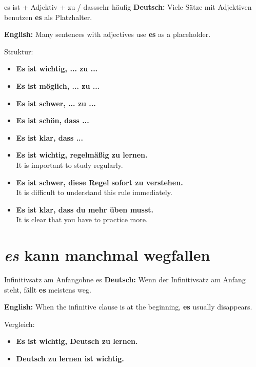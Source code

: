 \documentclass[a4paper,11pt]{article}
\newcommand{\GermanText}[1]{\textbf{Deutsch: }#1\par}
\newcommand{\EnglishText}[1]{{\small\color{SoftGray}\textbf{English: }#1\par}}
\newcommand{\ExampleItem}[2]{\item \textbf{#1}\\{\small\color{SoftGray}#2}}
\begin{document}
        \begin{grammarentry}{es ist + Adjektiv + zu / dass}{sehr häufig}
            \GermanText{Viele Sätze mit Adjektiven benutzen \textbf{es} als Platzhalter.}
            \EnglishText{Many sentences with adjectives use \textbf{es} as a placeholder.}
            
            Struktur:
            \begin{itemize}
                \item \textbf{Es ist wichtig, ... zu ...}
                \item \textbf{Es ist möglich, ... zu ...}
                \item \textbf{Es ist schwer, ... zu ...}
                \item \textbf{Es ist schön, dass ...}
                \item \textbf{Es ist klar, dass ...}
            \end{itemize}
        \end{grammarentry}
        
        \begin{exbox}
            \begin{itemize}
                \ExampleItem{Es ist wichtig, regelmäßig zu lernen.}{It is important to study regularly.}
                \ExampleItem{Es ist schwer, diese Regel sofort zu verstehen.}{It is difficult to understand this rule immediately.}
                \ExampleItem{Es ist klar, dass du mehr üben musst.}{It is clear that you have to practice more.}
            \end{itemize}
        \end{exbox}
    
    
    \section{\textit{es} kann manchmal wegfallen}
        
        \begin{grammarentry}{Infinitivsatz am Anfang}{ohne es}
            \GermanText{Wenn der Infinitivsatz am Anfang steht, fällt \textbf{es} meistens weg.}
            \EnglishText{When the infinitive clause is at the beginning, \textbf{es} usually disappears.}
            
            Vergleich:
            \begin{itemize}
                \item \textbf{Es ist wichtig, Deutsch zu lernen.}
                \item \textbf{Deutsch zu lernen ist wichtig.}
            \end{itemize}
        \end{grammarentry}
        
\end{document}
